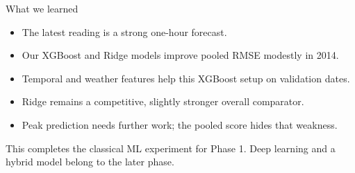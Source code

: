 \documentclass[aspectratio=169]{beamer}
\begin{document}
\begin{frame}{What we learned}
\begin{itemize}
\item The latest reading is a strong one-hour forecast.
\item Our XGBoost and Ridge models improve pooled RMSE modestly in 2014.
\item Temporal and weather features help this XGBoost setup on validation dates.
\item Ridge remains a competitive, slightly stronger overall comparator.
\item Peak prediction needs further work; the pooled score hides that weakness.
\end{itemize}
\medskip
This completes the classical ML experiment for Phase 1. Deep learning and a hybrid model belong to the later phase.
\end{frame}
\end{document}
